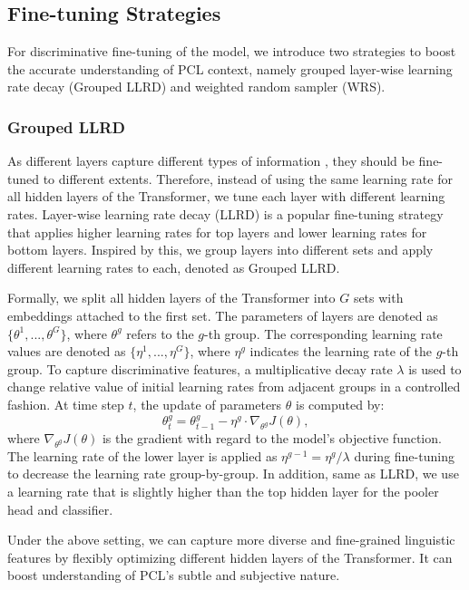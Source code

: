 \documentclass[11pt]{article}
\begin{document}
\subsection{Fine-tuning Strategies}
For discriminative fine-tuning of the model, we introduce two strategies to boost the accurate understanding of PCL context, namely grouped layer-wise learning rate decay (Grouped LLRD) and weighted random sampler (WRS). 


\subsubsection{Grouped LLRD}
As different layers capture different types of information \citep{yosinski2014transferable},  they should be fine-tuned to different extents. Therefore, instead of using the same learning rate for all hidden layers of the Transformer, we tune each layer with different learning rates. 
Layer-wise learning rate decay (LLRD) \citep{DBLP:conf/acl/RuderH18,DBLP:conf/iclr/0007WKWA21} 
is a popular fine-tuning strategy that applies higher learning rates for top layers and lower learning rates for bottom layers. 
Inspired by this, we group layers into different sets and apply different learning rates to each, denoted as Grouped LLRD. 

Formally, we split all hidden layers of the Transformer into $G$ sets with embeddings attached to the first set.
The parameters of layers are denoted as $\{\theta^1,...,\theta^G\}$, where $\theta^g$ refers to the $g$-th group. 
The corresponding learning rate values are denoted as $\{ \eta^1, ...,\eta^G\}$, where $\eta^g$ indicates the learning rate of the $g$-th group. 
To capture discriminative features, a multiplicative decay rate $\lambda$ is used to change relative value of initial learning rates from adjacent groups in a controlled fashion. At time step $t$, the update of parameters $\theta$ is computed by:
\begin{equation}
    \theta^g_{t} = \theta^g_{t-1} - \eta^g \cdot \nabla_{\theta^g} J(\theta),
\end{equation}
where $\nabla_{\theta^g} J(\theta)$ is the gradient with regard to the model’s objective function.
The learning rate of the lower layer is applied as $\eta^{g-1} = \eta^g / \lambda$ during fine-tuning to decrease the learning rate group-by-group. 
In addition, same as LLRD, we use a learning rate that is slightly higher than the top hidden layer for the pooler head and classifier.


Under the above setting, we can capture more diverse and fine-grained linguistic features by flexibly optimizing different hidden layers of the Transformer.
It can boost understanding of PCL's subtle and subjective nature. 
\end{document}
